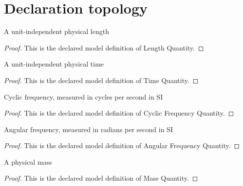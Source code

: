 \section{Declaration topology}
\begin{definition}
  \label{def:physics:phyx-mini-0205:phyxminiproblems-problemphyxmini0205-lengthquantity}
  A unit-independent physical length
\end{definition}
\begin{proof}
  This is the declared model definition of Length Quantity.
\end{proof}
\begin{definition}
  \label{def:physics:phyx-mini-0205:phyxminiproblems-problemphyxmini0205-timequantity}
  A unit-independent physical time
\end{definition}
\begin{proof}
  This is the declared model definition of Time Quantity.
\end{proof}
\begin{definition}
  \label{def:physics:phyx-mini-0205:phyxminiproblems-problemphyxmini0205-cyclicfrequencyquantity}
  Cyclic frequency, measured in cycles per second in SI
\end{definition}
\begin{proof}
  This is the declared model definition of Cyclic Frequency Quantity.
\end{proof}
\begin{definition}
  \label{def:physics:phyx-mini-0205:phyxminiproblems-problemphyxmini0205-angularfrequencyquantity}
  Angular frequency, measured in radians per second in SI
\end{definition}
\begin{proof}
  This is the declared model definition of Angular Frequency Quantity.
\end{proof}
\begin{definition}
  \label{def:physics:phyx-mini-0205:phyxminiproblems-problemphyxmini0205-massquantity}
  A physical mass
\end{definition}
\begin{proof}
  This is the declared model definition of Mass Quantity.
\end{proof}
